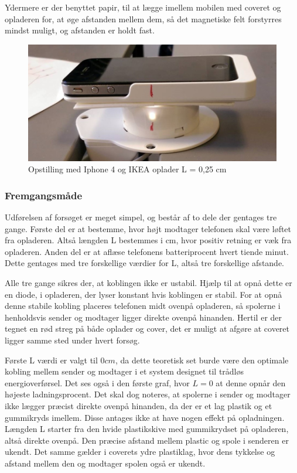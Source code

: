 Ydermere er der benyttet papir, til at lægge imellem mobilen med coveret og opladeren for, at øge afstanden mellem dem, så det magnetiske felt forstyrres mindst muligt, og afstanden er holdt fast. 

\begin{figure}
\includegraphics[width=1\textwidth]{Vildledning/Schematics/forsg2_opstilling1}
\caption{Opstilling med Iphone 4 og IKEA oplader L = 0,25 cm}
\label{figure:opstilling}
\end{figure}

\subsubsection{Fremgangsmåde}

Udførelsen af forsøget er meget simpel, og består af to dele der gentages tre gange. Første del er at bestemme, hvor højt modtager telefonen skal være løftet fra opladeren. Altså længden L bestemmes i cm, hvor positiv retning er væk fra opladeren. Anden del er at aflæse telefonens batteriprocent hvert tiende minut. Dette gentages med tre forskellige værdier for L, altså tre forskellige afstande.

Alle tre gange sikres der, at koblingen ikke er ustabil. Hjælp til at opnå dette er en diode, i opladeren, der lyser konstant hvis koblingen er stabil. For at opnå denne stabile kobling placeres telefonen midt ovenpå opladeren, så spolerne i henholdsvis sender og modtager ligger direkte ovenpå hinanden. Hertil er der tegnet en rød streg på både oplader og cover, det er muligt at afgøre at coveret ligger samme sted under hvert forsøg.

Første L værdi er valgt til $0 cm$, da dette teoretisk set burde være den optimale kobling mellem sender og modtager i et system designet til trådløs energioverførsel. Det ses også i den første graf, hvor $L = 0$ at denne opnår den højeste ladningsprocent. Det skal dog noteres, at spolerne i sender og modtager ikke lægger præcist direkte ovenpå hinanden, da der er et lag plastik og et gummikryds imellem. Disse antages ikke at have nogen effekt på opladningen. Længden L starter fra den hvide plastikskive med gummikrydset på opladeren, altså direkte ovenpå. Den præcise afstand mellem plastic og spole i senderen er ukendt. Det samme gælder i coverets ydre plastiklag, hvor dens tykkelse og afstand mellem den og modtager spolen også er ukendt.

